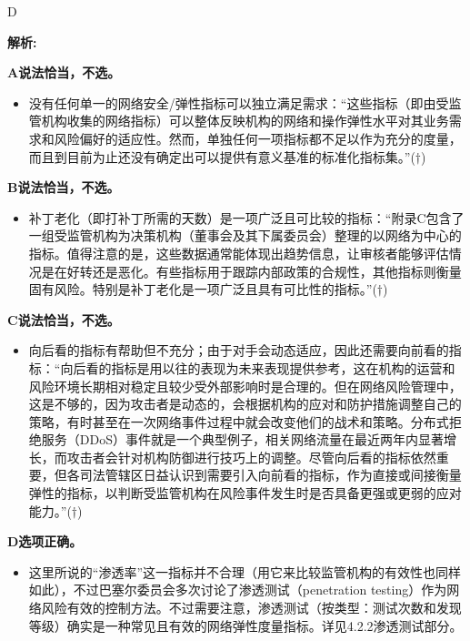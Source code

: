 \documentclass{article}
\newenvironment{explanation}
{\textbf{解析:}\par}
{\par}
\begin{document}
  \begin{correctanswer}
      D
  \end{correctanswer}
  
  \begin{explanation}
      

      \textbf{A说法恰当，不选。} 
      \begin{itemize}
          \item 没有任何单一的网络安全/弹性指标可以独立满足需求：“这些指标（即由受监管机构收集的网络指标）可以整体反映机构的网络和操作弹性水平对其业务需求和风险偏好的适应性。然而，单独任何一项指标都不足以作为充分的度量，而且到目前为止还没有确定出可以提供有意义基准的标准化指标集。”($\dagger$)
      \end{itemize}
      \textbf{B说法恰当，不选。} 
      \begin{itemize}
          \item 补丁老化（即打补丁所需的天数）是一项广泛且可比较的指标：“附录C包含了一组受监管机构为决策机构（董事会及其下属委员会）整理的以网络为中心的指标。值得注意的是，这些数据通常能体现出趋势信息，让审核者能够评估情况是在好转还是恶化。有些指标用于跟踪内部政策的合规性，其他指标则衡量固有风险。特别是补丁老化是一项广泛且具有可比性的指标。”($\dagger$)
      \end{itemize}
      \textbf{C说法恰当，不选。} 
      \begin{itemize}
          \item 向后看的指标有帮助但不充分；由于对手会动态适应，因此还需要向前看的指标：“向后看的指标是用以往的表现为未来表现提供参考，这在机构的运营和风险环境长期相对稳定且较少受外部影响时是合理的。但在网络风险管理中，这是不够的，因为攻击者是动态的，会根据机构的应对和防护措施调整自己的策略，有时甚至在一次网络事件过程中就会改变他们的战术和策略。分布式拒绝服务（DDoS）事件就是一个典型例子，相关网络流量在最近两年内显著增长，而攻击者会针对机构防御进行技巧上的调整。尽管向后看的指标依然重要，但各司法管辖区日益认识到需要引入向前看的指标，作为直接或间接衡量弹性的指标，以判断受监管机构在风险事件发生时是否具备更强或更弱的应对能力。”($\dagger$)
      \end{itemize}

      \textbf{D选项正确。}
      \begin{itemize}
          \item 这里所说的“渗透率”这一指标并不合理（用它来比较监管机构的有效性也同样如此），不过巴塞尔委员会多次讨论了渗透测试（penetration testing）作为网络风险有效的控制方法。不过需要注意，渗透测试（按类型：测试次数和发现等级）确实是一种常见且有效的网络弹性度量指标。详见4.2.2渗透测试部分。
      \end{itemize}
  \end{explanation}
  
\end{document}
